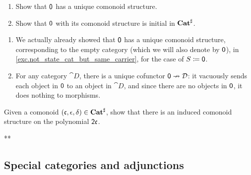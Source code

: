 \documentclass[Book-Poly]{subfiles}
\begin{document}
\begin{exercise}\label{exc.0_initial_com}
\begin{enumerate}
	\item Show that $\textsf{0}$ has a unique comonoid structure.
	\item Show that $\textsf{0}$ with its comonoid structure is initial in $\mathbf{Cat}^\sharp$.
\qedhere
\end{enumerate}
\begin{solution}
\begin{enumerate}
    \item We actually already showed that $\textsf{0}$ has a unique comonoid structure, corresponding to the empty category (which we will also denote by $\textsf{0}$), in \cref{exc.not_state_cat_but_same_carrier}, for the case of $S\coloneqq\textsf{0}$.
    \item For any category $\cat{D}$, there is a unique cofunctor $\textsf{0}\nrightarrow\mathcal{D}$: it vacuously sends each object in $\textsf{0}$ to an object in $\cat{D}$, and since there are no objects in $\textsf{0}$, it does nothing to morphisms.
\end{enumerate}
\end{solution}
\end{exercise}

\begin{exercise}
Given a comonoid $(\mathfrak{c},\epsilon,\delta)\in\mathbf{Cat}^\sharp$, show that there is an induced comonoid structure on the polynomial $\textsf{2}\mathfrak{c}$.
\begin{solution}
** %
\end{solution}
\end{exercise}

\subsection{Special categories and adjunctions}
\end{document}
